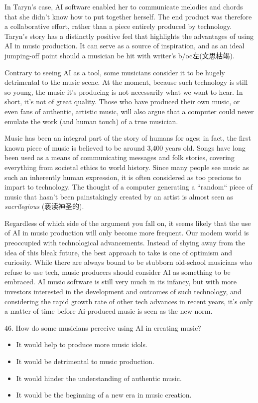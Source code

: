 \documentclass[UTF8,11pt]{ctexart}
\begin{document}
In Taryn's case, AI software enabled her to communicate melodies and chords that she didn't know how to put together herself. The end product was therefore a collaborative effort, rather than a piece entirely produced by technology. Taryn's story has a distinctly positive feel that highlights the advantages of using AI in music production. It can serve as a source of inspiration, and as an ideal jumping-off point should a musician be hit with writer's b/oc左(文思枯竭).


Contrary to seeing AI as a tool, some musicians consider it to be hugely detrimental to the music scene. At the moment, because such technology is still so young, the music it's producing is not necessarily what we want to hear. In short, it's not of great quality. Those who have produced their own music, or even fans of authentic, artistic music, will also argue that a computer could never emulate the work (and human touch) of a true musician.


Music has been an integral part of the story of humans for ages; in fact, the first known piece of music is believed to be around 3,400 years old. Songs have long been used as a means of communicating messages and folk stories, covering everything from societal ethics to world history. Since many people see music as such an inherently human expression, it is often considered as too precious to impart to technology. The thought of a computer generating a “random“ piece of music that hasn't been painstakingly created by an artist is almost seen as \textit{sacrilegious} (亵渎神圣的).


Regardless of which side of the argument you fall on, it seems likely that the use of AI in music production will only become more frequent. Our modem world is preoccupied with technological advancements. Instead of shying away from the idea of this bleak future, the best approach to take is one of optimism and curiosity. While there are always bound to be stubborn old-school musicians who refuse to use tech, music producers should consider AI as something to be embraced. AI music software is still very much in its infancy, but with more investors interested in the development and outcomes of such technology, and considering the rapid growth rate of other tech advances in recent years, it's only a matter of time before Ai-produced music is seen as the new norm.


46. How do some musicians perceive using AI in creating music?


\begin{itemize}[leftmargin=2em,itemsep=.2em,topsep=.4em]\item[A.] It would help to produce more music idols.
\item[B.] It would be detrimental to music production.
\item[C.] It would hinder the understanding of authentic music.
\item[D.] It would be the beginning of a new era in music creation.
\end{itemize}
\end{document}
